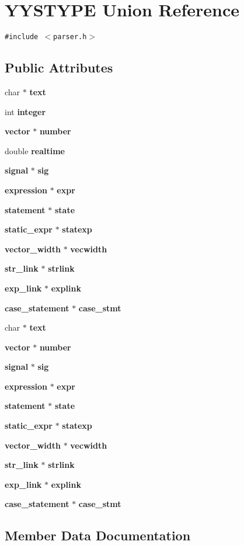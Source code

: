 \section{YYSTYPE Union Reference}
\label{unionYYSTYPE}
{\tt \#include $<$parser.h$>$}

\subsection*{Public Attributes}
\begin{CompactItemize}
\item 
char $\ast$ {\bf text}
\item 
int {\bf integer}
\item 
{\bf vector} $\ast$ {\bf number}
\item 
double {\bf realtime}
\item 
{\bf signal} $\ast$ {\bf sig}
\item 
{\bf expression} $\ast$ {\bf expr}
\item 
{\bf statement} $\ast$ {\bf state}
\item 
{\bf static\_\-expr} $\ast$ {\bf statexp}
\item 
{\bf vector\_\-width} $\ast$ {\bf vecwidth}
\item 
{\bf str\_\-link} $\ast$ {\bf strlink}
\item 
{\bf exp\_\-link} $\ast$ {\bf explink}
\item 
{\bf case\_\-statement} $\ast$ {\bf case\_\-stmt}
\item 
char $\ast$ {\bf text}
\item 
{\bf vector} $\ast$ {\bf number}
\item 
{\bf signal} $\ast$ {\bf sig}
\item 
{\bf expression} $\ast$ {\bf expr}
\item 
{\bf statement} $\ast$ {\bf state}
\item 
{\bf static\_\-expr} $\ast$ {\bf statexp}
\item 
{\bf vector\_\-width} $\ast$ {\bf vecwidth}
\item 
{\bf str\_\-link} $\ast$ {\bf strlink}
\item 
{\bf exp\_\-link} $\ast$ {\bf explink}
\item 
{\bf case\_\-statement} $\ast$ {\bf case\_\-stmt}
\end{CompactItemize}


\subsection{Member Data Documentation}
